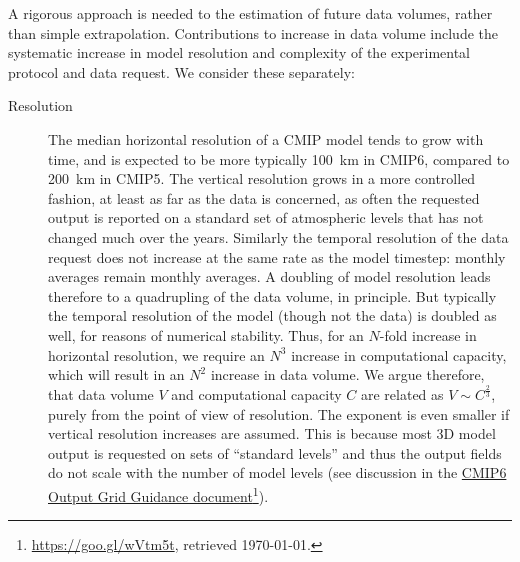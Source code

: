 \documentclass[gmd,manuscript]{copernicus}
\newcommand{\pllabel}[1]{\label{p-#1}\linelabel{l-#1}}
\newcommand{\urlref}[2] {\href{#1}{#2}\footnote{\url{#1}, retrieved \today.}}
\begin{document}
A rigorous approach is needed to the estimation of future
data volumes, rather than simple extrapolation. Contributions to
increase in data volume include the systematic increase in model
resolution and complexity of the experimental protocol and data
request. We consider these separately:

\begin{description}
\item[Resolution] The median horizontal resolution of a CMIP model
  tends to grow with time, and is expected to be more typically 100~km
  in CMIP6, compared to 200~km in CMIP5. The vertical resolution grows
  in a more controlled fashion, at least as far as the data is
  concerned, as often the requested output is reported on a standard
  set of atmospheric levels that has not changed much over the years.
  Similarly the temporal resolution of the data request does not
  increase at the same rate as the model timestep: monthly averages
  remain monthly averages. A doubling of model resolution leads
  therefore to a quadrupling of the data volume, in principle. But
  typically the temporal resolution of the model (though not the data)
  is doubled as well, for reasons of numerical stability. Thus, for an
  $N$-fold increase in horizontal resolution, we require an $N^3$
  increase in computational capacity, which will result in an $N^2$
  increase in data volume. We argue therefore, that data volume $V$
  and computational capacity $C$ are related as $V \sim C^\frac23$,
  purely from the point of view of resolution. The exponent is even
  smaller if vertical resolution increases are assumed.
  \pllabel{RC1-18}
  This is because most 3D model output is requested on sets of
  ``standard levels'' and thus the output fields do not scale with the
  number of model levels (see discussion in the
  \urlref{https://goo.gl/wVtm5t}{CMIP6 Output Grid Guidance
    document}).
  

\end{description}
\end{document}
